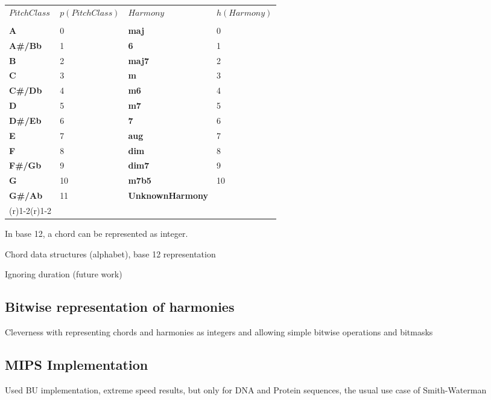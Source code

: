\begin{tabular}{llll}
\toprule
$PitchClass$ & $p(PitchClass)$ & $Harmony$ & $h(Harmony)$ \\
\cmidrule(r){1-2} \cmidrule(r){1-2} \\
\textbf{A}     & 0  & \textbf{maj} & 0 \\
\textbf{A#/Bb} & 1  & \textbf{6} & 1 \\
\textbf{B}     & 2  & \textbf{maj7} & 2 \\
\textbf{C}     & 3  & \textbf{m} & 3 \\
\textbf{C#/Db} & 4  & \textbf{m6} & 4 \\
\textbf{D}     & 5  & \textbf{m7} & 5 \\
\textbf{D#/Eb} & 6  & \textbf{7} & 6 \\
\textbf{E}     & 7  & \textbf{aug} & 7 \\
\textbf{F}     & 8  & \textbf{dim} & 8 \\
\textbf{F#/Gb} & 9  & \textbf{dim7} & 9 \\
\textbf{G}     & 10 & \textbf{m7b5} & 10 \\
\textbf{G#/Ab} & 11 & \textbf{UnknownHarmony} & \\
\cbottomrule(r){1-2}\cbottomrule(r){1-2}
\end{tabular}

In base 12, a chord can be represented as integer.

\item Chord data structures (alphabet), base 12 representation

\item Ignoring duration (future work)

\subsection{Bitwise representation of harmonies}

\item Cleverness with representing chords and harmonies as integers and allowing simple bitwise operations and bitmasks

\subsection{MIPS Implementation}

\item Used BU implementation, extreme speed results, but only for DNA and Protein sequences, the usual use case of Smith-Waterman

